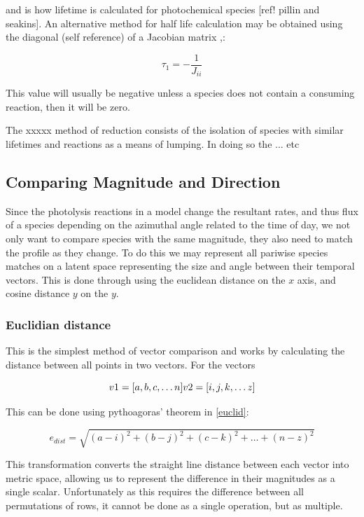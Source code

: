 and is how lifetime is calculated for photochemical species [ref! pillin and seakins]. An alternative method for half life calculation may be obtained using the diagonal (self reference) of a Jacobian matrix ,\cite{kinetics}:

\begin{equation}
\tau_1 = - \frac{1}{J_{ii}}
\end{equation} 

This value will usually be negative unless a species does not contain a consuming reaction, then it will be zero. 


The xxxxx method of reduction consists of the isolation of species with similar lifetimes and reactions as a means of lumping. In doing so the ... etc 


\subsection{Comparing Magnitude and Direction}
Since the photolysis reactions in a model change the resultant rates, and thus flux of a species depending on the azimuthal angle related to the time of day, we not only want to compare species with the same magnitude, they also need to match the profile as they change. To do this we may represent all pariwise species matches on a latent space representing the size and angle between their temporal vectors. This is done through using the euclidean distance on the $x$ axis, and cosine distance $y$ on the $y$. 

\subsubsection{Euclidian distance}
This is the simplest method of vector comparison and works by calculating the distance between all points in two vectors. For the vectors

\begin{equation}
v1 = [ a,b,c, \dots n ] 
$$$$
v2 = [ i,j,k, \dots z ]
\end{equation}

This can be done using pythoagoras' theorem in \autoref{euclid}:

\begin{equation}
e_{dist}  = \sqrt{(a-i)^2 + (b-j)^2 + (c-k)^2 + \dots + (n-z)^2}
\label{euclid}
\end{equation}

This transformation converts the straight line distance between each vector into metric space, allowing us to represent the difference in their magnitudes as a single scalar. Unfortunately as this requires the difference between all permutations of rows, it cannot be done as a single operation, but as multiple. \\

